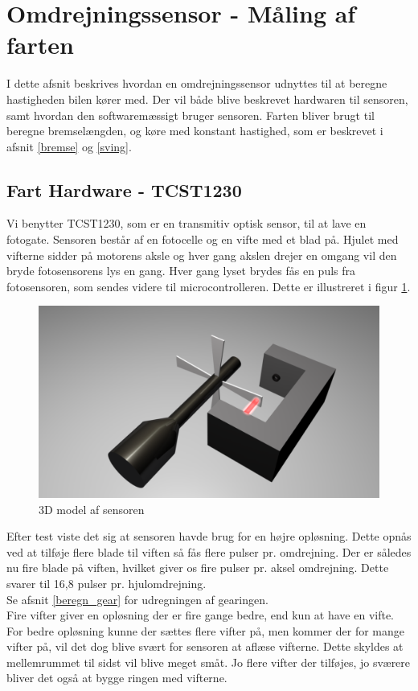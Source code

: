 \section{Omdrejningssensor - Måling af farten}
\label{fartmål}
I dette afsnit beskrives hvordan en omdrejningssensor udnyttes til at beregne hastigheden bilen kører med. Der vil både blive beskrevet hardwaren til sensoren, samt hvordan den softwaremæssigt bruger sensoren. Farten bliver brugt til beregne bremselængden, og køre med konstant hastighed, som er beskrevet i afsnit \ref{bremse} og \ref{sving}. \\

\subsection{Fart Hardware - TCST1230}
\label{fartmål_hardware}
Vi benytter TCST1230, som er en transmitiv optisk sensor, til at lave en fotogate. Sensoren består af en fotocelle og en vifte med et blad på. Hjulet med vifterne sidder på motorens aksle og hver gang akslen drejer en omgang vil den bryde fotosensorens lys en gang. Hver gang lyset brydes fås en puls fra fotosensoren, som sendes videre til microcontrolleren. Dette er illustreret i figur \ref{wheelspeed3D}.

\begin{figure}[h!]
\center
\includegraphics[scale=0.2]{./Graphics/Wheelspeed_D}
\caption{3D model af sensoren}
\label{wheelspeed3D}
\end{figure}

Efter test viste det sig at sensoren havde brug for en højre opløsning. Dette opnås ved at tilføje flere blade til viften så fås flere pulser pr. omdrejning. Der er således nu fire blade på viften, hvilket giver os fire pulser pr. aksel omdrejning. Dette svarer til 16,8 pulser pr. hjulomdrejning. \\
Se afsnit \ref{beregn_gear} for udregningen af gearingen. \\
Fire vifter giver en opløsning der er fire gange bedre, end kun at have en vifte. \\
For bedre opløsning kunne der sættes flere vifter på, men kommer der for mange vifter på, vil det dog blive svært for sensoren at aflæse vifterne. Dette skyldes at mellemrummet til sidst vil blive meget småt. Jo flere vifter der tilføjes, jo sværere bliver det også at bygge ringen med vifterne. \\

